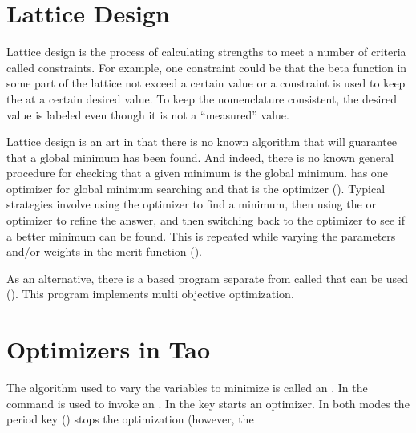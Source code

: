 {{{%
\section{Lattice Design}
\label{s:lat.design}

Lattice design is the process of calculating  strengths to meet a number of criteria
called constraints. For example, one constraint could be that the beta function in some part of the
lattice not exceed a certain value or a constraint is used to keep the  at a certain desired
value. To keep the nomenclature consistent, the desired value is labeled  even though it is not
a ``measured'' value.

Lattice design is an art in that there is no known algorithm that will guarantee that a global
minimum has been found. And indeed, there is no known general procedure for checking that a given
minimum is the global minimum. \tao has one optimizer for global minimum searching and that is the
 optimizer (). Typical strategies involve using the  optimizer to
find a minimum, then using the  or  optimizer to refine the answer, and then
switching back to the  optimizer to see if a better minimum can be found. This is repeated
while varying the  parameters and/or weights in the merit function ().

As an alternative, there is a \bmad based program separate from \tao called  that can be
used (). This program implements multi objective optimization.

\section{Optimizers in Tao}
\label{s:tao.opti}

The algorithm used to vary the  variables to minimize  is called an .
In  the  command is used to invoke an . In  the  key starts an optimizer. In both modes the period key () stops the
optimization (however, the \vn{global%
be set to False to prevent this). Running an optimizer is also called ``fitting'' since one is
trying to get the \vn{model} data to be equal to the \vn{measured} data. With orbits this is also
called ``flattening'' since one generally wants to end up with an orbit that is on--axis.

}}}}
